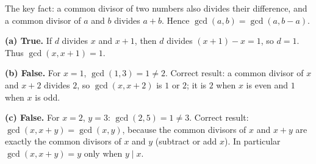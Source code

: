 The key fact: a common divisor of two numbers also divides their difference, and a common divisor of $a$ and $b$ divides $a+b$. Hence $\gcd(a,b)=\gcd(a,b-a)$.

\textbf{(a) True.} If $d$ divides $x$ and $x+1$, then $d$ divides $(x+1)-x=1$, so $d=1$. Thus $\gcd(x,x+1)=1$.

\textbf{(b) False.} For $x=1$, $\gcd(1,3)=1\ne2$. Correct result: a common divisor of $x$ and $x+2$ divides $2$, so $\gcd(x,x+2)$ is $1$ or $2$; it is $2$ when $x$ is even and $1$ when $x$ is odd.

\textbf{(c) False.} For $x=2$, $y=3$: $\gcd(2,5)=1\ne3$. Correct result: $\gcd(x,x+y)=\gcd(x,y)$, because the common divisors of $x$ and $x+y$ are exactly the common divisors of $x$ and $y$ (subtract or add $x$). In particular $\gcd(x,x+y)=y$ only when $y\mid x$.
